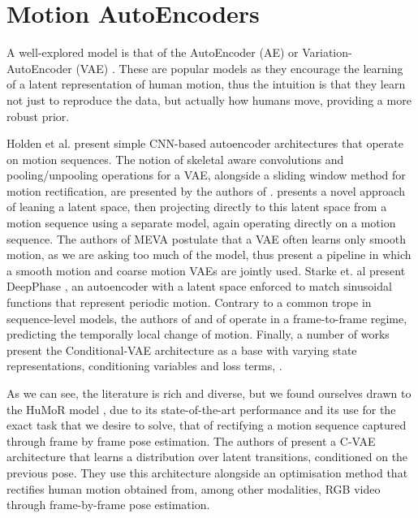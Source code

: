 \section{Motion AutoEncoders}

A well-explored model is that of the AutoEncoder (AE) \cite{bank2021_autoencoders} or Variation-AutoEncoder (VAE) \cite{kingma2022_VAE}. These are popular models as they encourage the learning of a latent representation \cite{bank2021_autoencoders} of human motion, thus the intuition is that they learn not just to reproduce the data, but actually how humans move, providing a more robust prior.


Holden et al. \cite{ConvAutoEnv2015} \cite{ConvAutoEnv2016} present simple CNN-based autoencoder architectures that operate on motion sequences. The notion of skeletal aware convolutions and pooling/unpooling operations for a VAE, alongside a sliding window method for motion rectification, are presented by the authors of \cite{HierarchicalMotionVAE}. \cite{TransformerVAEPrior} presents a novel approach of leaning a latent space, then projecting directly to this latent space from a motion sequence using a separate model, again operating directly on a motion sequence. The authors of MEVA \cite{MEVA} postulate that a VAE often learns only smooth motion, as we are asking too much of the model, thus present a pipeline in which a smooth motion and coarse motion VAEs are jointly used. Starke et. al present DeepPhase \cite{DeepPhase}, an autoencoder with a latent space enforced to match sinusoidal functions that represent periodic motion. Contrary to a common trope in sequence-level models, the authors of \cite{learnedInbetweening} and of \cite{MotionVAE} operate in a frame-to-frame regime, predicting the temporally local change of motion. Finally, a number of works present the Conditional-VAE architecture \cite{CVAE} as a base with varying state representations, conditioning variables and loss terms, \cite{humor, learnedInbetweening, MotionVAE, structured4Dlatentspace}.

As we can see, the literature is rich and diverse, but we found ourselves drawn to the HuMoR model \cite{humor}, due to its state-of-the-art performance and its use for the exact task that we desire to solve, that of rectifying a motion sequence captured through frame by frame pose estimation. The authors of \cite{humor} present a C-VAE architecture that learns a distribution over latent transitions, conditioned on the previous pose. They use this architecture alongside an optimisation method that rectifies human motion obtained from, among other modalities, RGB video through frame-by-frame pose estimation.